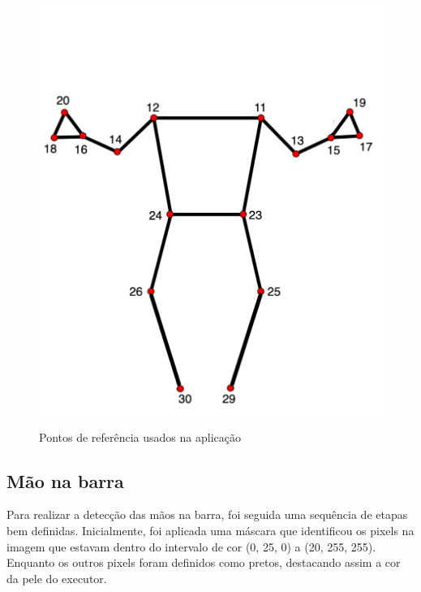 \begin{figure}[H]
	\centering
	\caption{Pontos de referência usados na aplicação}
	\includegraphics[scale=0.2]{figuras/eph/pose_landmarks_custom.png}
	\label{fig:Pontos de referencia usados na aplicacao}
\end{figure}

\subsection[Mão na barra]{Mão na barra}\label{sec:Mao na barra}


Para realizar a detecção das mãos na barra, foi seguida uma sequência de etapas bem definidas. Inicialmente, foi aplicada uma máscara que identificou os pixels na imagem que estavam dentro do intervalo de cor (0, 25, 0) a (20, 255, 255). Enquanto os outros pixels foram definidos como pretos, destacando assim a cor da pele do executor.

